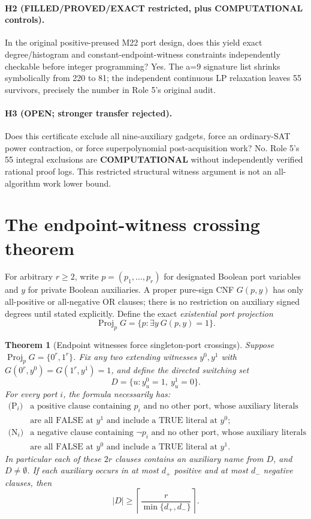 \documentclass[11pt]{article}
\newtheorem{theorem}{Theorem}
\begin{document}
\paragraph{H2 (FILLED/PROVED/EXACT restricted, plus COMPUTATIONAL controls).}
In the original positive-preused M22 port design, does this yield exact degree/histogram and constant-endpoint-witness constraints independently checkable before integer programming? Yes. The a=9 signature list shrinks symbolically from 220 to 81; the independent continuous LP relaxation leaves 55 survivors, precisely the number in Role 5's original audit.

\paragraph{H3 (OPEN; stronger transfer rejected).}
Does this certificate exclude all nine-auxiliary gadgets, force an ordinary-SAT power contraction, or force superpolynomial post-acquisition work? No. Role 5's 55 integral exclusions are \textbf{COMPUTATIONAL} without independently verified rational proof logs. This restricted structural witness argument is not an all-algorithm work lower bound.

\section{The endpoint-witness crossing theorem}
For arbitrary $r\ge2$, write $p=(p_1,\ldots,p_r)$ for designated Boolean port variables and $y$ for private Boolean auxiliaries. A proper pure-sign CNF $G(p,y)$ has only all-positive or all-negative OR clauses; there is no restriction on auxiliary signed degrees until stated explicitly. Define the exact \emph{existential port projection}
\[
\operatorname{Proj}_pG=\{p:\exists y\ G(p,y)=1\}.
\]

\begin{theorem}[Endpoint witnesses force singleton-port crossings]\label{th:cross}
Suppose $\operatorname{Proj}_pG=\{0^r,1^r\}$. Fix \emph{any} two extending witnesses $y^0,y^1$ with $G(0^r,y^0)=G(1^r,y^1)=1$, and define the directed switching set
\[
D=\{u:y^0_u=1,\ y^1_u=0\}.
\]
For every port $i$, the formula necessarily has:
\[
\begin{array}{ll}
\text{(P$_i$)}&\text{a positive clause containing }p_i
\text{ and no other port, whose auxiliary literals}\\
&\text{are all FALSE at }y^1\text{ and include a TRUE literal at }y^0;\\[2mm]
\text{(N$_i$)}&\text{a negative clause containing }\neg p_i
\text{ and no other port, whose auxiliary literals}\\
&\text{are all FALSE at }y^0\text{ and include a TRUE literal at }y^1.
\end{array}
\]
In particular each of these $2r$ clauses contains an auxiliary name from $D$, and $D\ne\emptyset$. If each auxiliary occurs in at most $d_+$ positive and at most $d_-$ negative clauses, then
\[
\boxed{\quad |D|\ge\left\lceil
 \frac{r}{\min\{d_+,d_-\}}\right\rceil.\quad}
\]
\end{theorem}
\end{document}
